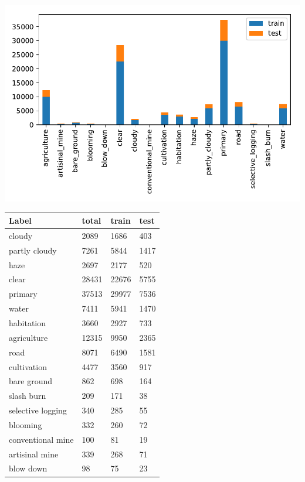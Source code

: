 \documentclass[11pt,oneside,a4paper]{article}
\newenvironment{Figure}
{\par\medskip\noindent\minipage{\linewidth}}
{\endminipage\par\medskip}
\begin{document}
\begin{multicols}{2}
\begin{Figure}
 \centering
 \includegraphics[width=\linewidth, height=1.\linewidth]{labels.pdf}
 \label{fig:labels}
\end{Figure}
\small{
\begin{Figure}
\begin{tabularx}{1\columnwidth}{l|l|l|l}
\hline
\hline
Label & total & train & test \\ \hline
cloudy & 2089 & 1686 & 403\\ 
partly cloudy &  7261 & 5844 & 1417\\  
haze &   2697  & 2177 & 520 \\
clear &   28431 & 22676 & 5755 \\
primary & 37513 & 29977 & 7536\\
water & 7411  & 5941 & 1470 \\
habitation & 3660  & 2927 & 733 \\
agriculture & 12315 & 9950 & 2365\\
road & 8071 & 6490 & 1581 \\
cultivation & 4477 & 3560 & 917\\
bare ground & 862 & 698 & 164\\
slash burn & 209 & 171 & 38\\
selective logging & 340 & 285 & 55 \\
blooming & 332 & 260 & 72\\
conventional mine & 100 & 81 & 19\\
artisinal mine & 339 & 268 & 71 \\
blow down & 98 & 75 & 23\\ \hline
\end{tabularx}
\label{tab:labels}
\end{Figure}
}

\end{multicols}
\end{document}
